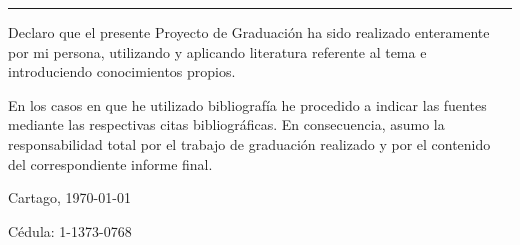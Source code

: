\thispagestyle{empty}

\rule{10mm}{0pt}


Declaro que el presente Proyecto de Graduación ha sido realizado enteramente
por mi persona, utilizando y aplicando literatura referente al tema e
introduciendo conocimientos propios.

En los casos en que he utilizado bibliografía he procedido a indicar las
fuentes mediante las respectivas citas bibliográficas.  En consecuencia,
asumo la responsabilidad total por el trabajo de graduación realizado y por
el contenido del correspondiente informe final.



\vspace*{20mm}

\begin{flushright}
  \scriptAuthor\par
  Cartago, \today\par
  Cédula: 1-1373-0768
\end{flushright}


